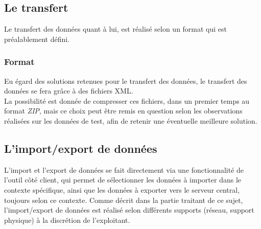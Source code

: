 \subsection{Le transfert}
Le transfert des données quant à lui, est réalisé selon un format qui est préalablement défini.

\subsubsection{Format}
Eu égard des solutions retenues pour le transfert des données, le transfert des données se fera grâce à des fichiers XML. \\
La possibilité est donnée de compresser ces fichiers, dans un premier temps au format \emph{ZIP}, mais ce choix peut être remis en question selon les observations réalisées sur les données de test, afin de retenir une éventuelle meilleure solution.

\subsection{L'import/export de données}
L'import et l'export de données se fait directement via une fonctionnalité de l'outil côté client, qui permet de sélectionner les données à importer dans le contexte spécifique, ainsi que les données à exporter vers le serveur central, toujours selon ce contexte.
Comme décrit dans la partie traitant de ce sujet, l'import/export de données est réalisé selon différents supports (réseau, support physique) à la discrétion de l'exploitant.
